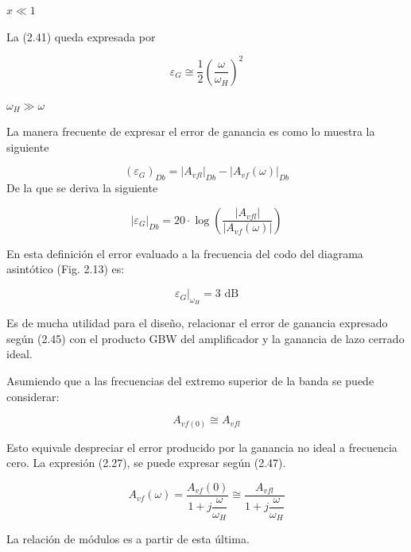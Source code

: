 \noindent $x \ll 1$
\vspace{4mm}

\noindent La (2.41) queda expresada por

\begin{equation}
    \varepsilon_G \cong \frac{1}{2} \left( \frac{\omega}{\omega_H} \right)^2 \tag{2.43}
\end{equation}

\noindent $\omega_H \gg \omega$
\vspace{4mm}

\noindent La manera frecuente de expresar el error de ganancia es como lo muestra la siguiente

\begin{equation}
    (\varepsilon_G)_{Db} = |A_{vfl}|_{Db} - |A_{vf}(\omega)|_{Db} \tag{2.44}
\end{equation}
\noindent De la que se deriva la siguiente

\begin{equation}
|\varepsilon_G|_{Db} = 20 \cdot \log \left( \frac{|A_{vfl}|}{|A_{vf}(\omega)|} \right) \tag{2.45}
\end{equation}

\noindent En esta definición el error evaluado a la frecuencia del codo del diagrama asintótico (Fig. 2.13) es:

\begin{equation*}
\varepsilon_G \big|_{\omega_H} = 3 \text{ dB}
\end{equation*}

\noindent Es de mucha utilidad para el diseño, relacionar el error de ganancia expresado según (2.45) con el producto GBW del amplificador y la ganancia de lazo cerrado ideal.

\noindent Asumiendo que a las frecuencias del extremo superior de la banda se puede considerar:

\begin{equation}
A_{vf(0)} \cong A_{vfl} \tag{2.46}
\end{equation}

\noindent Esto equivale despreciar el error producido por la ganancia no ideal a frecuencia cero. La expresión (2.27), se puede expresar según (2.47).

\begin{equation}
A_{vf}(\omega) = \frac{A_{vf}(0)}{1 + j \dfrac{\omega}{\omega_H}} \cong \frac{A_{vfl}}{1 + j \dfrac{\omega}{\omega_H}} \tag{2.47}
\end{equation}

\noindent La relación de módulos es a partir de esta última.


